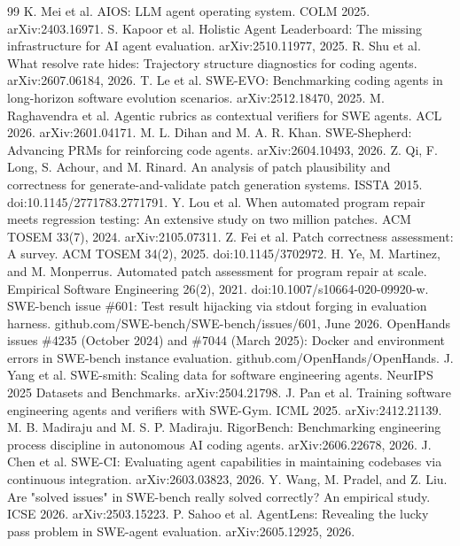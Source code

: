\documentclass{article}
\begin{document}
\begin{thebibliography}{99}
 K. Mei et al. AIOS: LLM agent operating system. COLM 2025. arXiv:2403.16971.
 S. Kapoor et al. Holistic Agent Leaderboard: The missing infrastructure for AI agent evaluation. arXiv:2510.11977, 2025.
 R. Shu et al. What resolve rate hides: Trajectory structure diagnostics for coding agents. arXiv:2607.06184, 2026.
 T. Le et al. SWE-EVO: Benchmarking coding agents in long-horizon software evolution scenarios. arXiv:2512.18470, 2025.
 M. Raghavendra et al. Agentic rubrics as contextual verifiers for SWE agents. ACL 2026. arXiv:2601.04171.
 M. L. Dihan and M. A. R. Khan. SWE-Shepherd: Advancing PRMs for reinforcing code agents. arXiv:2604.10493, 2026.
 Z. Qi, F. Long, S. Achour, and M. Rinard. An analysis of patch plausibility and correctness for generate-and-validate patch generation systems. ISSTA 2015. doi:10.1145/2771783.2771791.
 Y. Lou et al. When automated program repair meets regression testing: An extensive study on two million patches. ACM TOSEM 33(7), 2024. arXiv:2105.07311.
 Z. Fei et al. Patch correctness assessment: A survey. ACM TOSEM 34(2), 2025. doi:10.1145/3702972.
 H. Ye, M. Martinez, and M. Monperrus. Automated patch assessment for program repair at scale. Empirical Software Engineering 26(2), 2021. doi:10.1007/s10664-020-09920-w.
 SWE-bench issue \#601: Test result hijacking via stdout forging in evaluation harness. github.com/SWE-bench/SWE-bench/issues/601, June 2026.
 OpenHands issues \#4235 (October 2024) and \#7044 (March 2025): Docker and environment errors in SWE-bench instance evaluation. github.com/OpenHands/OpenHands.
 J. Yang et al. SWE-smith: Scaling data for software engineering agents. NeurIPS 2025 Datasets and Benchmarks. arXiv:2504.21798.
 J. Pan et al. Training software engineering agents and verifiers with SWE-Gym. ICML 2025. arXiv:2412.21139.
 M. B. Madiraju and M. S. P. Madiraju. RigorBench: Benchmarking engineering process discipline in autonomous AI coding agents. arXiv:2606.22678, 2026.
 J. Chen et al. SWE-CI: Evaluating agent capabilities in maintaining codebases via continuous integration. arXiv:2603.03823, 2026.
 Y. Wang, M. Pradel, and Z. Liu. Are "solved issues" in SWE-bench really solved correctly? An empirical study. ICSE 2026. arXiv:2503.15223.
 P. Sahoo et al. AgentLens: Revealing the lucky pass problem in SWE-agent evaluation. arXiv:2605.12925, 2026.

\end{thebibliography}
\end{document}
